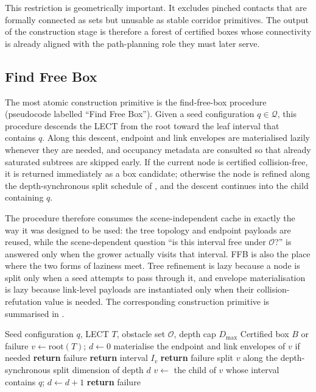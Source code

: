 \documentclass[journal]{IEEEtran}
\newcommand{\calO}{\ensuremath{\mathcal{O}}}
\newcommand{\Q}{\ensuremath{\mathcal{Q}}}
\begin{document}
This restriction is geometrically important. It excludes pinched contacts that
are formally connected as sets but unusable as stable corridor primitives. The
output of the construction stage is therefore a forest of certified boxes whose
connectivity is already aligned with the path-planning role they must later
serve.

\subsection{Find Free Box}\label{sec:forest_ffb}

The most atomic construction primitive is the find-free-box procedure (pseudocode
labelled ``Find Free Box''). Given a seed configuration $q\in\Q$, this
procedure descends the LECT from the root toward the leaf interval that
contains $q$. Along this descent, endpoint and link envelopes are
materialised lazily whenever they are needed, and occupancy metadata are
consulted so that already saturated subtrees are skipped early. If the current
node is certified collision-free, it is returned immediately as a box candidate;
otherwise the node is refined along the depth-synchronous split schedule of
, and the descent continues into the child containing $q$.

The procedure therefore consumes the scene-independent cache in exactly the way
it was designed to be used: the tree topology and endpoint payloads are reused,
while the scene-dependent question ``is this interval free under $\calO$?'' is
answered only when the grower actually visits that interval. FFB is also the
place where the two forms of laziness meet. Tree refinement is lazy because a
node is split only when a seed attempts to pass through it, and envelope
materialisation is lazy because link-level payloads are instantiated only when
their collision-refutation value is needed. The corresponding construction
primitive is summarised in .

\begin{algorithm}[t]
\caption{Find Free Box}
\label{alg:ffb_rewrite}
\footnotesize
\begin{algorithmic}[1]
\REQUIRE Seed configuration $q$, LECT $T$, obstacle set $\calO$, depth cap $D_{\max}$
\ENSURE Certified box $B$ or failure
\STATE $v \gets \mathrm{root}(T)$; $d \gets 0$
  \STATE materialise the endpoint and link envelopes of $v$ if needed
    \STATE \textbf{return} failure
  \ENDIF
  \IF{$v$ is certified collision-free with respect to $\calO$}
    \STATE \textbf{return} interval $I_v$
  \ENDIF
    \STATE \textbf{return} failure
  \ENDIF
    \STATE split $v$ along the depth-synchronous split dimension of depth $d$
  \ENDIF
  \STATE $v \gets$ the child of $v$ whose interval contains $q$; $d \gets d+1$
\ENDWHILE
\STATE \textbf{return} failure
\end{algorithmic}
\end{algorithm}
\end{document}
